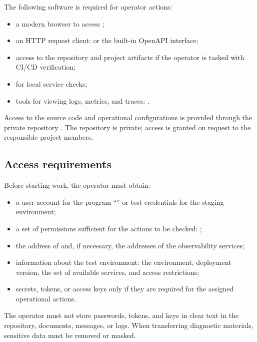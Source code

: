 \documentclass[12pt,a4paper]{extarticle}
\begin{document}
\begin{hseExample}
The following software is required for operator actions:

\begin{itemize}[leftmargin=1.25cm]
    \item a modern browser to access ;
    \item an HTTP request client:  or the built-in OpenAPI interface;
    \item access to the  repository and project artifacts if the operator is tasked with CI/CD verification;
    \item {} for local service checks;
    \item tools for viewing logs, metrics, and traces: .
\end{itemize}

Access to the source code and operational configurations is provided through the private repository . The repository is private; access is granted on request to the responsible project members.
\end{hseExample}

\subsection{Access requirements}

\begin{hseExample}
Before starting work, the operator must obtain:

\begin{itemize}[leftmargin=1.25cm]
    \item a user account for the program \enquote{\projectname} or test credentials for the staging environment;
    \item a set of permissions sufficient for the actions to be checked: ;
    \item the address of  and, if necessary, the addresses of the observability services;
    \item information about the test environment: the environment, deployment version, the set of available services, and access restrictions;
    \item secrets, tokens, or access keys only if they are required for the assigned operational actions.
\end{itemize}

The operator must not store passwords, tokens, and keys in clear text in the repository, documents, messages, or logs. When transferring diagnostic materials, sensitive data must be removed or masked.
\end{hseExample}
\end{document}
